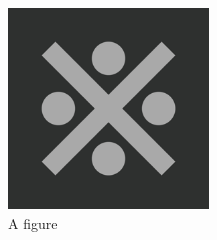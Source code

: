 \begin{figure}[h!]
    \centering
        \includegraphics[width=0.475\textwidth]{fig}
    \caption{A figure}
    \label{fig:figure1}
\end{figure}
